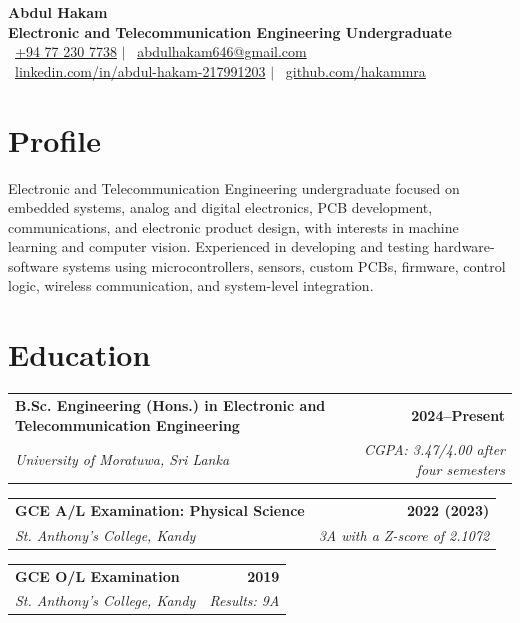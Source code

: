 \documentclass[a4paper,10pt]{article}
\makeatletter
\newcommand{\educationEntry}[4]{%
  \begin{tabularx}{\textwidth}{@{}Xr@{}}
    \textbf{#1} & \textbf{\small #2} \\
    \textit{#3} & \textit{\small #4}
  \end{tabularx}
}
\makeatother
\begin{document}
\fontsize{9.5}{11.25}\selectfont

\begin{center}
  {\LARGE\bfseries Abdul Hakam}\\[0.75mm]
  {\large\bfseries Electronic and Telecommunication Engineering Undergraduate}\\[1.5mm]

  \small
  \faPhone\ \href{tel:+94772307738}{+94 77 230 7738}
  \quad $\vert$ \quad
  \faEnvelope\ \href{mailto:abdulhakam646@gmail.com}{abdulhakam646@gmail.com}\\[0.8mm]

  \faLinkedin\ 
  \href{https://www.linkedin.com/in/abdul-hakam-217991203}
  {linkedin.com/in/abdul-hakam-217991203}
  \quad $\vert$ \quad
  \faGithub\ 
  \href{https://github.com/hakammra}
  {github.com/hakammra}
\end{center}

\vspace{-1.2mm}

\section{Profile}
Electronic and Telecommunication Engineering undergraduate focused on embedded systems, analog and digital electronics, PCB development, communications, and electronic product design, with interests in machine learning and computer vision. Experienced in developing and testing hardware-software systems using microcontrollers, sensors, custom PCBs, firmware, control logic, wireless communication, and system-level integration.
\section{Education}
\educationEntry
  {B.Sc. Engineering (Hons.) in Electronic and Telecommunication Engineering}
  {2024--Present}
  {University of Moratuwa, Sri Lanka}
  {CGPA: 3.47/4.00 after four semesters}

\vspace{1.35mm}
\educationEntry
  {GCE A/L Examination: Physical Science}
  {2022 (2023)}
  {St. Anthony's College, Kandy}
  {3A with a Z-score of 2.1072}

\vspace{1.35mm}
\educationEntry
  {GCE O/L Examination}
  {2019}
  {St. Anthony's College, Kandy}
  {Results: 9A}
\end{document}
